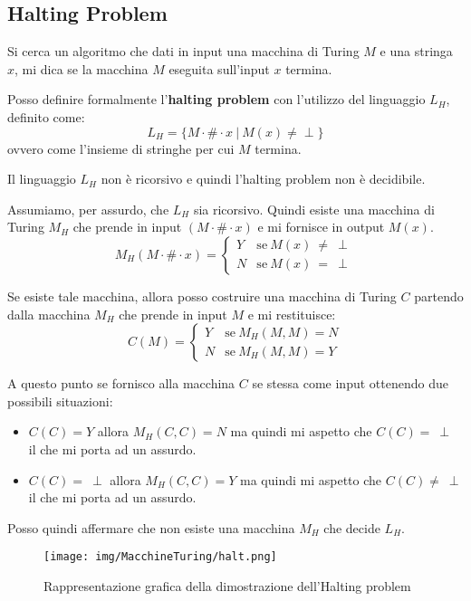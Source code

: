 \subsection{Halting Problem}
Si cerca un algoritmo che dati in input una macchina di Turing $M$ e una stringa $x$, mi dica se la macchina $M$ eseguita sull'input $x$ termina.

\begin{definizione}
    Posso definire formalmente l'\textbf{halting problem} con l'utilizzo del linguaggio $L_H$, definito come:
    \begin{equation}
        L_H = \{M \cdot \# \cdot x \ | \ M(x) \neq \perp \}
    \end{equation}
    ovvero come l'insieme di stringhe per cui $M$ termina.
\end{definizione}
\begin{teorema}
    Il linguaggio $L_H$ non è ricorsivo e quindi l'halting problem non è decidibile.
\end{teorema}
\begin{dimostrazione} 
    Assumiamo, per assurdo, che $L_H$ sia ricorsivo. Quindi esiste una macchina di Turing $M_H$ che prende in input $(M \cdot \# \cdot x)$ e mi fornisce in output $M(x)$.
    \begin{equation}
        M_H (M \cdot \# \cdot x) = \begin{cases}
            Y & \text{se} \ M(x) \ \neq \ \perp \\
            N & \text{se} \ M(x) \  = \ \perp
        \end{cases}
    \end{equation}

    Se esiste tale macchina, allora posso costruire una macchina di Turing $C$ partendo dalla macchina $M_H$ che prende in input $M$ e mi restituisce:
    \begin{equation}
        C(M) = \begin{cases}
            Y & \text{se} \ M_H(M, M) = N \\
            N & \text{se} \ M_H(M, M) = Y
        \end{cases}
    \end{equation}

    A questo punto se fornisco alla macchina $C$ se stessa come input ottenendo due possibili situazioni:
    \begin{itemize}
        \item $C(C) = Y$ allora $M_H(C, C) = N$ ma quindi mi aspetto che $C(C)  = \ \perp$ il che mi porta ad un assurdo.
        \item $C(C) =\ \perp$ allora $M_H(C, C) =  Y$ ma quindi mi aspetto che $C(C)  \neq \ \perp$ il che mi porta ad un assurdo.
    \end{itemize}

    Posso quindi affermare che non esiste una macchina $M_H$ che decide $L_H$.
    \begin{figure}
        \centering
        \texttt{[image: img/MacchineTuring/halt.png]}
        \caption{Rappresentazione grafica della dimostrazione dell'Halting problem}
    \end{figure}
\end{dimostrazione}
